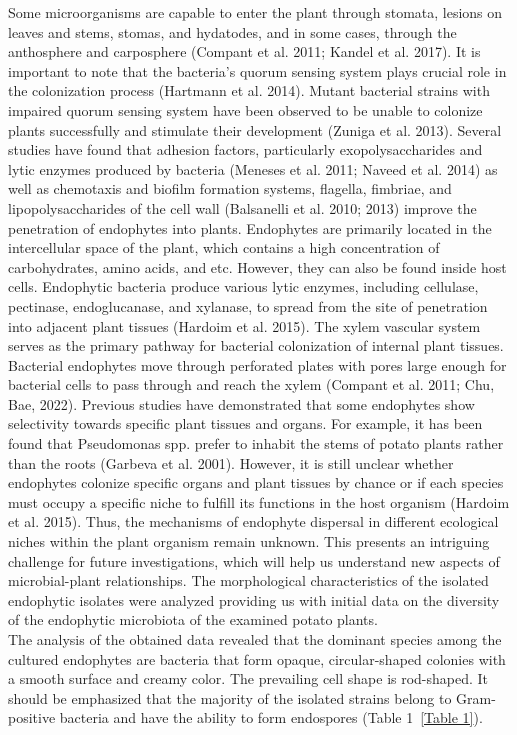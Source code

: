 \documentclass[sn-mathphys,Numbered]{sn-jnl}%
\theoremstyle{thmstyleone}%
\theoremstyle{thmstyletwo}%
\theoremstyle{thmstylethree}%
\begin{document}
Some microorganisms are capable to enter the plant through stomata, lesions on leaves and stems, stomas, and hydatodes, and in some cases, through the anthosphere and carposphere (Compant et al. 2011; Kandel et al. 2017). It is important to note that the bacteria's quorum sensing system plays crucial role in the colonization process (Hartmann et al. 2014). Mutant bacterial strains with impaired quorum sensing system have been observed to be unable to colonize plants successfully and stimulate their development (Zuniga et al. 2013). Several studies have found that adhesion factors, particularly exopolysaccharides and lytic enzymes produced by bacteria (Meneses et al. 2011; Naveed et al. 2014) as well as chemotaxis and biofilm formation systems, flagella, fimbriae, and lipopolysaccharides of the cell wall (Balsanelli et al. 2010; 2013) improve the penetration of endophytes into plants.
Endophytes are primarily located in the intercellular space of the plant, which contains a high concentration of carbohydrates, amino acids, and etc. However, they can also be found inside host cells. Endophytic bacteria produce various lytic enzymes, including cellulase, pectinase, endoglucanase, and xylanase, to spread from the site of penetration into adjacent plant tissues (Hardoim et al. 2015). The xylem vascular system serves as the primary pathway for bacterial colonization of internal plant tissues. Bacterial endophytes move through perforated plates with pores large enough for bacterial cells to pass through and reach the xylem (Compant et al. 2011; Chu, Bae, 2022).
Previous studies have demonstrated that some endophytes show selectivity towards specific plant tissues and organs. For example, it has been found that Pseudomonas spp. prefer to inhabit the stems of potato plants rather than the roots (Garbeva et al. 2001). However, it is still unclear whether endophytes colonize specific organs and plant tissues by chance or if each species must occupy a specific niche to fulfill its functions in the host organism (Hardoim et al. 2015). Thus, the mechanisms of endophyte dispersal in different ecological niches within the plant organism remain unknown. This presents an intriguing challenge for future investigations, which will help us understand new aspects of microbial-plant relationships.
The morphological characteristics of the isolated endophytic isolates were analyzed providing us with initial data on the diversity of the endophytic microbiota of the examined potato plants.\\
The analysis of the obtained data revealed that the dominant species among the cultured endophytes are bacteria that form opaque, circular-shaped colonies with a smooth surface and creamy color. The prevailing cell shape is rod-shaped. It should be emphasized that the majority of the isolated strains belong to Gram-positive bacteria and have the ability to form endospores (Table 1~\ref{Table 1}).
\end{document}
